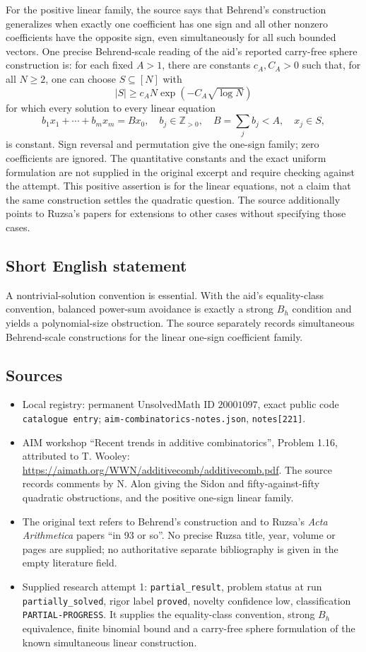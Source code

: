 \documentclass[11pt]{article}
\newcommand{\Z}{\mathbb{Z}}
\begin{document}
For the positive linear family, the source says that Behrend's construction generalizes when exactly one coefficient has one sign and all other nonzero coefficients have the opposite sign, even simultaneously for all such bounded vectors. One precise Behrend-scale reading of the aid's reported carry-free sphere construction is: for each fixed \(A>1\), there are constants \(c_A,C_A>0\) such that, for all \(N\geq2\), one can choose \(S\subseteq[N]\) with
\[
 |S|\geq c_A N\exp(-C_A\sqrt{\log N})
\]
for which every solution to every linear equation
\[
 b_1x_1+\cdots+b_mx_m=Bx_0,\quad
 b_j\in\Z_{>0},\quad B=\sum_jb_j<A,\quad x_j\in S,
\]
is constant. Sign reversal and permutation give the one-sign family; zero coefficients are ignored. The quantitative constants and the exact uniform formulation are not supplied in the original excerpt and require checking against the attempt. This positive assertion is for the linear equations, not a claim that the same construction settles the quadratic question. The source additionally points to Ruzsa's papers for extensions to other cases without specifying those cases.
\subsection{Short English statement}
A nontrivial-solution convention is essential. With the aid's equality-class convention, balanced power-sum avoidance is exactly a strong \(B_h\) condition and yields a polynomial-size obstruction. The source separately records simultaneous Behrend-scale constructions for the linear one-sign coefficient family.
\subsection{Sources}
\begin{itemize}
\item Local registry: permanent UnsolvedMath ID \(20001097\), exact public code \texttt{catalogue entry}; \texttt{aim-combinatorics-notes.json}, \texttt{notes[221]}.
\item AIM workshop ``Recent trends in additive combinatorics'', Problem 1.16, attributed to T. Wooley: \url{https://aimath.org/WWN/additivecomb/additivecomb.pdf}. The source records comments by N. Alon giving the Sidon and fifty-against-fifty quadratic obstructions, and the positive one-sign linear family.
\item The original text refers to Behrend's construction and to Ruzsa's \emph{Acta Arithmetica} papers ``in 93 or so''. No precise Ruzsa title, year, volume or pages are supplied; no authoritative separate bibliography is given in the empty literature field.
\item Supplied research attempt 1: \texttt{partial\_result}, problem status at run \texttt{partially\_solved}, rigor label \texttt{proved}, novelty confidence low, classification \texttt{PARTIAL-PROGRESS}. It supplies the equality-class convention, strong \(B_h\) equivalence, finite binomial bound and a carry-free sphere formulation of the known simultaneous linear construction.
\end{itemize}
\end{document}
